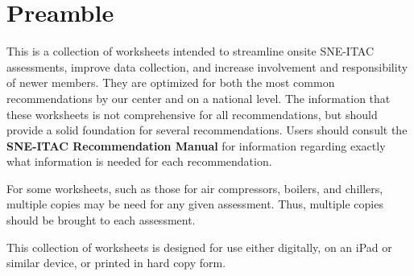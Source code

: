 \maketitle

\section*{Preamble}

This is a collection of worksheets intended to streamline onsite SNE-ITAC assessments, improve data collection, and increase involvement and responsibility of newer members. They are optimized for both the most common recommendations by our center and on a national level. The information that these worksheets is not comprehensive for all recommendations, but should provide a solid foundation for several recommendations. Users should consult the \textbf{SNE-ITAC Recommendation Manual} for information regarding exactly what information is needed for each recommendation. 

For some worksheets, such as those for air compressors, boilers, and chillers, multiple copies may be need for any given assessment. Thus, multiple copies should be brought to each assessment. 

This collection of worksheets is designed for use either digitally, on an iPad or similar device, or printed in hard copy form. 

\clearpage